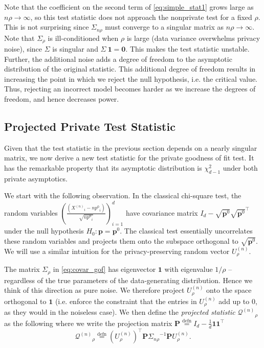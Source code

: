 \documentclass[twoside,letterpaper]{article} \usepackage{aistats2017}
\theoremstyle{definition}
\theoremstyle{remark}
\begin{document}
Note that the coefficient on the second term of \eqref{eq:simple_stat1} grows large as $n \rho\rightarrow \infty$, so this test statistic does not approach the nonprivate test for a fixed $\rho$. This is not surprising since ${{\Sigma}_{{n \rho }}}$ must converge to a singular matrix as $n \rho\rightarrow \infty$.  
\else
Note that ${{\Sigma}_{{\rho}}}$ is ill-conditioned when $\rho$ is large (data variance overwhelms privacy noise), since ${\Sigma}$ is singular and ${\Sigma}\ {\pmb{1}}=\mathbf{0}$. This makes the test statistic unstable. 
\fi
  Further, the additional noise adds a degree of freedom to the asymptotic distribution of the original statistic.  This additional degree of freedom results in increasing the point in which we reject the null hypothesis, i.e. the critical value.  Thus, rejecting an incorrect model becomes harder as we increase the degrees of freedom, and hence decreases power.  

\subsection{Projected Private Test Statistic}
Given that the test statistic in the previous section depends on a nearly singular matrix,
we now derive a new test statistic for the private goodness of fit test. It has the remarkable property that its asymptotic distribution is $\chi^2_{d-1}$ under both private asymptotics. 

We start with the following observation.  In the classical chi-square test, the random variables $\left(\frac{({X^{({n})}}_i-n{p^0}_i)}{\sqrt{n{p^0}_i}}\right)_{i=1}^d$ have covariance matrix $I_d - \sqrt{{\mathbf{p}}^0}\sqrt{{\mathbf{p}}^0}^\intercal$ under the null hypothesis $H_0: {\mathbf{p}} = {{\mathbf{p}}^0}$. The classical test essentially uncorrelates these random variables and projects 
 them onto the subspace orthogonal to $\sqrt{{\mathbf{p}}^0}$. We will use a similar intuition for the privacy-preserving random vector ${U^{(n)}_{{\rho}}}$.
 

The matrix ${{\Sigma}_{{\rho}}}$ in  \eqref{eq:covar_gof} has eigenvector ${\pmb{1}}$ with eigenvalue $1/\rho$ -- regardless of the true parameters of the data-generating distribution. Hence we think of this direction as pure noise.
We therefore project ${U^{(n)}_{{\rho}}}$ onto the space orthogonal to ${\pmb{1}}$ (i.e. enforce the constraint that the entries in ${U^{(n)}_{{\rho}}}$ add up to $0$, as they would in the noiseless case).  We then define the \emph{projected statistic} ${\pmb{\mathcal{Q}}^{({n})}}_\rho$ as the following where we write the projection matrix ${\pmb{P}} \stackrel{\mathrm{defn}}{=} I_d - \frac{1}{d} {\pmb{1}}{\pmb{1}}^\intercal$
\begin{equation}
 {\pmb{\mathcal{Q}}^{({n})}}_{\rho} \stackrel{\mathrm{defn}}{=} \left({U^{(n)}_{{\rho}}}\right)^\intercal{\pmb{P}} {{\Sigma}_{{n \rho }}}^{-1} {\pmb{P}} {U^{(n)}_{{\rho}}}.
\label{eq:new_stat2}
\end{equation}
\end{document}
